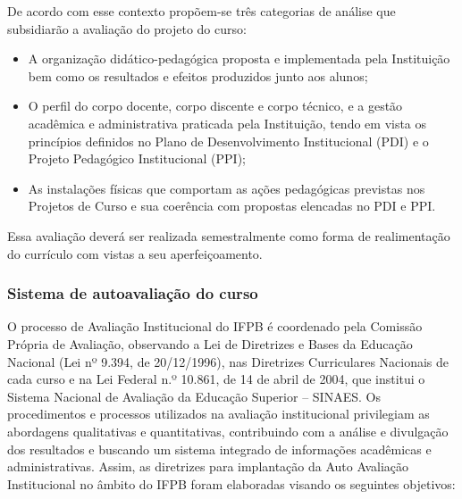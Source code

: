 De acordo com esse contexto propõem-se três categorias de análise que subsidiarão a avaliação do projeto do curso:
\begin{itemize}
	\item A organização didático-pedagógica proposta e implementada pela Instituição bem como os resultados e efeitos produzidos junto aos alunos;
	\item O perfil do corpo docente, corpo discente e corpo técnico, e a gestão acadêmica e administrativa praticada pela Instituição, tendo em vista os princípios definidos no Plano de Desenvolvimento Institucional (PDI) e o Projeto Pedagógico Institucional (PPI);
	\item As instalações físicas que comportam as ações pedagógicas previstas nos Projetos de Curso e sua coerência com propostas elencadas no PDI e PPI.
\end{itemize}
	
	Essa avaliação deverá ser realizada semestralmente como forma de realimentação do currículo com vistas a seu aperfeiçoamento.

\subsubsection{Sistema de autoavaliação do curso}

O processo de Avaliação Institucional do IFPB é coordenado pela Comissão Própria de Avaliação, observando a Lei de Diretrizes e Bases da Educação Nacional (Lei nº 9.394, de 20/12/1996), nas Diretrizes Curriculares Nacionais de cada curso e na Lei Federal n.º 10.861, de 14 de abril de 2004, que institui o Sistema Nacional de Avaliação da Educação Superior – SINAES. Os procedimentos e processos utilizados na avaliação institucional privilegiam as abordagens qualitativas e quantitativas, contribuindo com a análise e divulgação dos resultados e buscando um sistema integrado de informações acadêmicas e administrativas. Assim, as diretrizes para implantação da Auto Avaliação Institucional no âmbito do IFPB foram elaboradas visando os seguintes objetivos:

